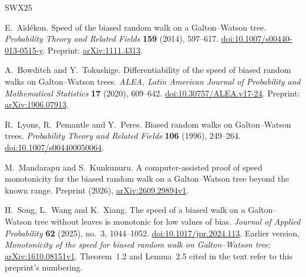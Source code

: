 \documentclass[11pt,a4paper]{article}
\numberwithin{equation}{section}
\theoremstyle{plain}
\theoremstyle{definition}
\theoremstyle{remark}
\begin{document}
\begin{thebibliography}{SWX25}

E.~A\"id\'ekon.
\newblock Speed of the biased random walk on a Galton--Watson tree.
\newblock \emph{Probability Theory and Related Fields} \textbf{159}
(2014), 597--617.
\newblock \href{https://doi.org/10.1007/s00440-013-0515-y}{doi:10.1007/s00440-013-0515-y}.
\newblock Preprint: \href{https://arxiv.org/abs/1111.4313}{arXiv:1111.4313}.

A.~Bowditch and Y.~Tokushige.
\newblock Differentiability of the speed of biased random walks on
Galton--Watson trees.
\newblock \emph{ALEA, Latin American Journal of Probability and Mathematical
Statistics} \textbf{17} (2020), 609--642.
\newblock \href{https://doi.org/10.30757/ALEA.v17-24}{doi:10.30757/ALEA.v17-24}.
\newblock Preprint: \href{https://arxiv.org/abs/1906.07913}{arXiv:1906.07913}.

R.~Lyons, R.~Pemantle and Y.~Peres.
\newblock Biased random walks on Galton--Watson trees.
\newblock \emph{Probability Theory and Related Fields} \textbf{106}
(1996), 249--264.
\newblock \href{https://doi.org/10.1007/s004400050064}{doi:10.1007/s004400050064}.

M.~Mandarapu and S.~Kunkunuru.
\newblock A computer-assisted proof of speed monotonicity for the biased
random walk on a Galton--Watson tree beyond the known range.
\newblock Preprint (2026),
\href{https://arxiv.org/abs/2609.29894}{arXiv:2609.29894v1}.

H.~Song, L.~Wang and K.~Xiang.
\newblock The speed of a biased walk on a Galton--Watson tree without leaves
is monotonic for low values of bias.
\newblock \emph{Journal of Applied Probability} \textbf{62} (2025),
no.~3, 1044--1052.
\newblock \href{https://doi.org/10.1017/jpr.2024.113}{doi:10.1017/jpr.2024.113}.
\newblock Earlier version, \emph{Monotonicity of the speed for biased random
walk on Galton--Watson tree}:
\href{https://arxiv.org/abs/1610.08151}{arXiv:1610.08151v1}.
Theorem~1.2 and Lemma~2.5 cited in the text refer to this preprint's
numbering.

\end{thebibliography}
\end{document}
